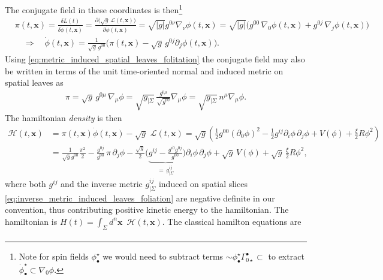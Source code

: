 \documentclass[../QFT_main.tex]{subfiles}
\begin{document}
\begin{mytheorem}
\noindent
The conjugate field in these coordinates is then\footnote{Note for spin fields $\phi^\star_\bullet$ we would need to subtract terms $\sim \phi^\star_{\bullet} \Gamma_{0\star}^\bullet \subset $ to extract $\dot{\phi}^\star_\bullet\subset \nabla_0\phi$.}
{\small
\begin{align}
    &\pi(t,\mathbf{x}) = \frac{\delta L(t)}{\delta \dot{\phi}(t,\mathbf{x})}= \frac{\partial\big(\sqrt{g}\, \mathcal{L}(t,\mathbf{x})\big)}{\partial \dot{\phi}(t,\mathbf{x})} = \sqrt{|g|} g^{0\nu} \nabla_\nu \phi(t,\mathbf{x}) = \sqrt{|g|} \Big( g^{00} \,\nabla_0\phi(t,\mathbf{x}) + g^{0j} \,\nabla_{\!j} \phi(t,\mathbf{x}) \Big)\\
    & \quad \Rightarrow \quad \dot{\phi}(t,\mathbf{x}) = \frac{1}{\sqrt{g}\, g^{00}} \Big( \pi(t,\mathbf{x}) - \sqrt{g}\, g^{0j} \partial_j\phi(t,\mathbf{x}) \Big).
\end{align}}
Using \eqref{eq:metric_induced_spatial_leaves_folitation} the conjugate field may also be written in terms of the unit time-oriented normal and induced metric on spatial leaves as
\begin{align}\label{eq:conjugate_field_vs_normal_spatial_slice}
  \pi = \sqrt{g}\,g^{0\mu}\,\nabla_\mu\phi= \sqrt{g_{|\Sigma}}\, \frac{g^{0\mu}}{\sqrt{g^{00}}} \nabla_\mu \phi = \sqrt{g_{|\Sigma}}\, n^\mu \nabla_\mu \phi.
\end{align}
The hamiltonian \emph{density} is then
{\small\begin{align}\label{eq:hamiltonian_density_curved_spacetime_KG}
    \mathcal{H}(t,\mathbf{x}) &= \pi(t,\mathbf{x}) \dot{\phi}(t,\mathbf{x}) - \sqrt{g}\,\,\mathcal{L}(t,\mathbf{x}) = \sqrt{g}\left(\tfrac12 g^{00}(\partial_0\phi)^2-\tfrac12 g^{ij}\partial_i\phi\,\partial_j\phi + V(\phi) + \tfrac{\xi}{2} R \phi^2\right) 
    \\[3pt]
    &= \frac{1}{\sqrt{g} g^{00}} \frac{\pi^2}{2} - \frac{g^{0j}}{g^{00}}\, \pi\, \partial_j\phi - \frac{\sqrt{g}}{2} \Big(\underbrace{g^{ij} - \tfrac{g^{i0}g^{0j}}{g^{00}}}_{=\, g_{|\Sigma}^{ij}}\Big)\partial_i\phi\,\partial_j\phi + \sqrt{g}\,V(\phi) + \sqrt{g}\,\tfrac{\xi}{2} R \phi^2,
\end{align}}
where both $g^{ij}$ and the inverse metric $g_{|\Sigma}^{ij}$ induced on spatial slices \eqref{eq:inverse_metric_induced_leaves_foliation} are negative definite in our convention, thus contributing positive kinetic energy to the hamiltonian.
The hamiltonian is $\displaystyle H(t) = \int_\Sigma d^n\mathbf{x}\,\,\, \mathcal{H}(t,\mathbf{x})$.
The classical hamilton equations are
\begin{align}\label{eq:hamilton_equation_classical_klein_gordon_field}

\end{align}
\end{mytheorem}
\end{document}
